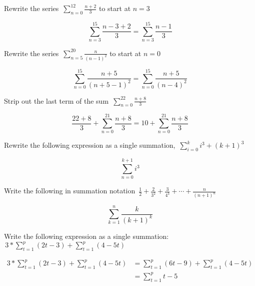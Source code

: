 \documentclass[addpoints]{exam}
\begin{document}
\begin{questions}
    \question Rewrite the series $\displaystyle\, \sum\limits_{n=0}^{12} \frac{n+2}{3}$ to start at $n=3$
    \begin{solution}[\stretch{1}]
      \[
        \sum\limits_{n=3}^{15} \frac{n-3+2}{3} = \sum\limits_{n=3}^{15} \frac{n-1}{3}
      \]      
    \end{solution}

    \question Rewrite the series $\displaystyle\, \sum\limits_{n=5}^{20} \frac{n}{(n-1)^2}$ to start at $n=0$
    \begin{solution}[\stretch{1}]
      \[
        \sum\limits_{n=0}^{15} \frac{n+5}{(n+5-1)^2} = \sum\limits_{n=0}^{15} \frac{n+5}{(n-4)^2}
      \]
    \end{solution}

    \newpage 

    \question Strip out the last term of the sum $\displaystyle\, \sum\limits_{n=0}^{22} \frac{n+8}{3}$ 
    \begin{solution}[\stretch{1}]
      \[
        \frac{22+8}{3} + \sum\limits_{n=0}^{21} \frac{n+8}{3} = 10 + \sum\limits_{n=0}^{21} \frac{n+8}{3}
      \]
    \end{solution}

    \question Rewrite the following expression as a single summation, $\displaystyle\, \sum\limits_{i=0}^{k} i^3 + \left(k+1\right)^3$
    \begin{solution}[\stretch{1}]
      \[
        \sum\limits_{n=0}^{k+1} i^3 
      \]
    \end{solution}

    \question Write the following in summation notation $\displaystyle\, \frac{1}{2} + \frac{2}{3^2} + \frac{3}{4^3} + \cdots + \frac{n}{\left(n+1\right)^n}$ 
    \begin{solution}[\stretch{1}]
      \[
        \sum\limits_{k=1}^{n} \frac{k}{\left(k+1\right)^k}
      \]
    \end{solution}

    \question Write the following expression as a single summation: $\displaystyle\, 3 * \sum\limits_{t=1}^{p} \left(2t-3\right) + \sum\limits_{t=1}^{p} \left(4-5t\right)$
    \begin{solution}[\stretch{1}]
      \begin{align*}
        3 * \sum\limits_{t=1}^{p} \left(2t-3\right) + \sum\limits_{t=1}^{p} \left(4-5t\right) &= \sum\limits_{t=1}^{p} \left(6t-9\right) + \sum\limits_{t=1}^{p} \left(4-5t\right) \\ 
        &= \sum\limits_{t=1}^{p} t-5
      \end{align*}
    \end{solution}
  \end{questions}
\end{document}
